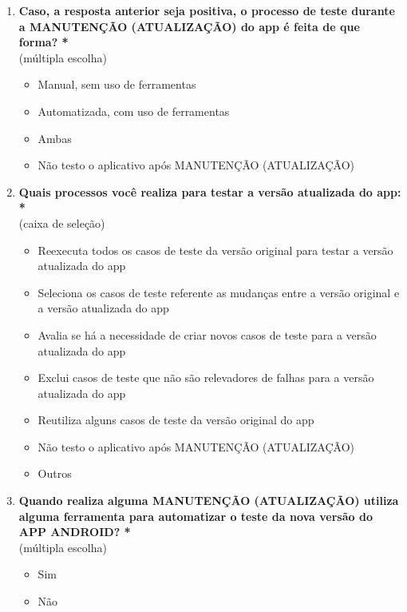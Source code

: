 \begin{enumerate}[label=\bf A\arabic*,leftmargin=1.8cm]
\begin{enumerate}[label= \arabic*]
    \item \textbf{Caso, a resposta anterior seja positiva, o processo de teste durante a MANUTENÇÃO (ATUALIZAÇÃO) do app é feita de que forma? *}\\
    (múltipla escolha)
    \begin{itemize}
        \item Manual, sem uso de ferramentas
        \item Automatizada, com uso de ferramentas
        \item Ambas
        \item Não testo o aplicativo após MANUTENÇÃO (ATUALIZAÇÃO)
    \end{itemize}
    
    \item \textbf{Quais processos você realiza para testar a versão atualizada do app: *}\\
    (caixa de seleção)
    \begin{itemize}
        \item Reexecuta todos os casos de teste da versão original para testar a versão atualizada do app
        \item Seleciona os casos de teste referente as mudanças entre a versão original e a versão atualizada do app
        \item Avalia se há a necessidade de criar novos casos de teste para a versão atualizada do app
        \item Exclui casos de teste que não são relevadores de falhas para a versão atualizada do app
        \item Reutiliza alguns casos de teste da versão original do app
        \item Não testo o aplicativo após MANUTENÇÃO (ATUALIZAÇÃO)
        \item Outros
    \end{itemize}
    
    \item \textbf{Quando realiza alguma MANUTENÇÃO (ATUALIZAÇÃO) utiliza alguma ferramenta para automatizar o teste da nova versão do APP ANDROID? *}\\
    (múltipla escolha)
    \begin{itemize}
        \item Sim
        \item Não
    \end{itemize}
    

\end{enumerate}
\end{enumerate}
